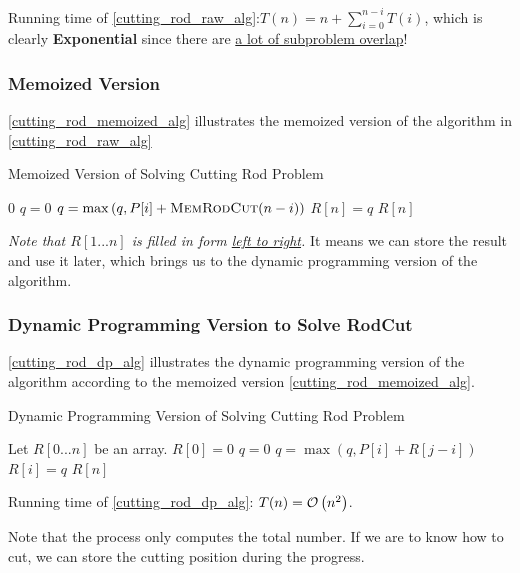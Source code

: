 Running time of \cref{cutting_rod_raw_alg}:$T(n) = n + \sum_{i=0}^{n-i}T(i)$, which is clearly \textbf{Exponential} since there are \underline{a lot of subproblem overlap}!

\subsubsection{Memoized Version}
\cref{cutting_rod_memoized_alg} illustrates the memoized version of the algorithm in \cref{cutting_rod_raw_alg}
\begin{algorithm}[H]
\caption{Memoized Version of Solving Cutting Rod Problem}\label{cutting_rod_memoized_alg}
\begin{algorithmic}[1]
 
    \Return $0$
\EndIf
{}
    \State $q=0$
\State $q = \max\left(q, P[i]+\textsc{MemRodCut} (n-i)\right)$
    \EndFor
    \State $R[n] = q$
\EndIf
\Return $R[n]$
\EndProcedure
\end{algorithmic}
\end{algorithm}

\emph{Note that $R[1...n]$ is filled in form \underline{left to right}.} It means we can store the result and use it later, which brings us to the dynamic programming version of the algorithm.

\subsubsection{Dynamic Programming Version to Solve RodCut}
\cref{cutting_rod_dp_alg} illustrates the dynamic programming version of the algorithm according to the memoized version \cref{cutting_rod_memoized_alg}.
\begin{algorithm}[H]
\caption{Dynamic Programming Version of Solving Cutting Rod Problem}\label{cutting_rod_dp_alg}
\begin{algorithmic}[1]
\State Let $R[0...n]$ be an array.
\State $R[0] = 0$
    \State $q = 0$
        \State $q = \max(q, P[i] + R[j-i])$
    \EndFor
    \State $R[i] = q$
\EndFor
\Return $R[n]$
\EndProcedure
\end{algorithmic}
\end{algorithm}

Running time of \cref{cutting_rod_dp_alg}: $T(n) = \mathcal{O}\left(n^2\right)$.

Note that the process only computes the total number. If we are to know how to cut, we can store the cutting position during the progress.

